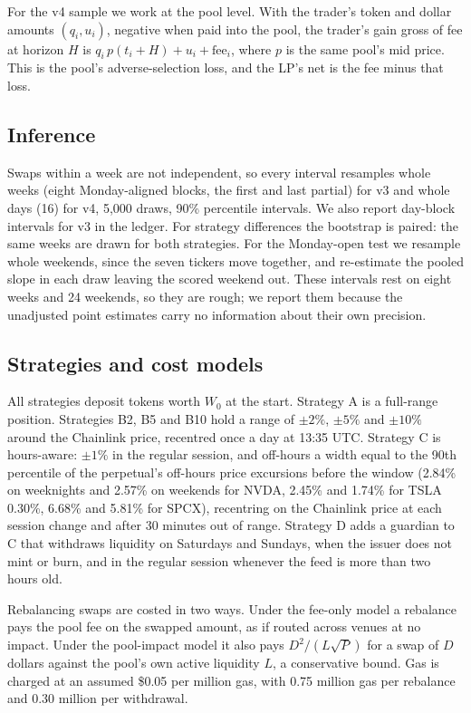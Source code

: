 \documentclass[11pt]{article}
\newcommand{\USD}{\$}
\begin{document}
For the v4 sample we work at the pool level. With the trader's token and dollar amounts $(q_i, u_i)$, negative when paid into the pool, the trader's gain gross of fee at horizon $H$ is $q_i\,p(t_i+H) + u_i + \mathrm{fee}_i$, where $p$ is the same pool's mid price. This is the pool's adverse-selection loss, and the LP's net is the fee minus that loss.

\subsection{Inference}

Swaps within a week are not independent, so every interval resamples whole weeks (eight Monday-aligned blocks, the first and last partial) for v3 and whole days (16) for v4, 5,000 draws, 90\% percentile intervals. We also report day-block intervals for v3 in the ledger. For strategy differences the bootstrap is paired: the same weeks are drawn for both strategies. For the Monday-open test we resample whole weekends, since the seven tickers move together, and re-estimate the pooled slope in each draw leaving the scored weekend out. These intervals rest on eight weeks and 24 weekends, so they are rough; we report them because the unadjusted point estimates carry no information about their own precision.

\subsection{Strategies and cost models}

All strategies deposit tokens worth $W_0$ at the start. Strategy A is a full-range position. Strategies B2, B5 and B10 hold a range of $\pm2\%$, $\pm5\%$ and $\pm10\%$ around the Chainlink price, recentred once a day at 13:35 UTC. Strategy C is hours-aware: $\pm1\%$ in the regular session, and off-hours a width equal to the 90th percentile of the perpetual's off-hours price excursions before the window (2.84\% on weeknights and 2.57\% on weekends for NVDA, 2.45\% and 1.74\% for TSLA 0.30\%, 6.68\% and 5.81\% for SPCX), recentring on the Chainlink price at each session change and after 30 minutes out of range. Strategy D adds a guardian to C that withdraws liquidity on Saturdays and Sundays, when the issuer does not mint or burn, and in the regular session whenever the feed is more than two hours old.

Rebalancing swaps are costed in two ways. Under the fee-only model a rebalance pays the pool fee on the swapped amount, as if routed across venues at no impact. Under the pool-impact model it also pays $D^2/(L\sqrt{P})$ for a swap of $D$ dollars against the pool's own active liquidity $L$, a conservative bound. Gas is charged at an assumed \USD0.05 per million gas, with 0.75 million gas per rebalance and 0.30 million per withdrawal.
\end{document}
